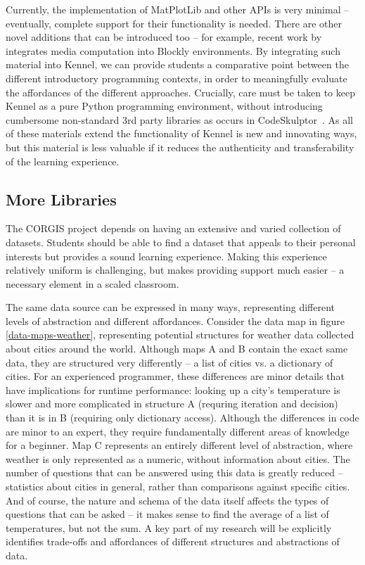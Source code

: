 Currently, the implementation of MatPlotLib and other APIs is very minimal -- eventually, complete support for their functionality is needed.
There are other novel additions that can be introduced too -- for example, recent work by \cite{pixly} integrates media computation into Blockly environments.
By integrating such material into Kennel, we can provide students a comparative point between the different introductory programming contexts, in order to meaningfully evaluate the affordances of the different approaches.
Crucially, care must be taken to keep Kennel as a pure Python programming environment, without introducing cumbersome non-standard 3rd party libraries as occurs in CodeSkulptor~\cite{code-skulptor}.
As all of these materials extend the functionality of Kennel is new and innovating ways, but this material is less valuable if it reduces the authenticity and transferability of the learning experience.

\subsection{More Libraries}

The CORGIS project depends on having an extensive and varied collection of datasets. 
Students should be able to find a dataset that appeals to their personal interests but provides a sound learning experience.
Making this experience relatively uniform is challenging, but makes providing support much easier -- a necessary element in a scaled classroom.

The same data source can be expressed in many ways, representing different levels of abstraction and different affordances.
Consider the data map in figure \ref{data-maps-weather}, representing potential structures for weather data collected about cities around the world.
Although maps A and B contain the exact same data, they are structured very differently -- a list of cities vs. a dictionary of cities.
For an experienced programmer, these differences are minor details that have implications for runtime performance: looking up a city's temperature is slower and more complicated in structure A (requring iteration and decision) than it is in B (requiring only dictionary access).
Although the differences in code are minor to an expert, they require fundamentally different areas of knowledge for a beginner.
Map C represents an entirely different level of abstraction, where weather is only represented as a numeric, without information about cities.
The number of questions that can be answered using this data is greatly reduced -- statistics about cities in general, rather than comparisons against specific cities.
And of course, the nature and schema of the data itself affects the types of questions that can be asked -- it makes sense to find the average of a list of temperatures, but not the sum.
A key part of my research will be explicitly identifies trade-offs and affordances of different structures and abstractions of data.

